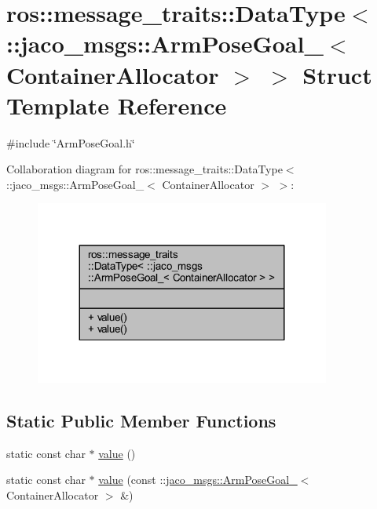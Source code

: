 \hypertarget{structros_1_1message__traits_1_1DataType_3_01_1_1jaco__msgs_1_1ArmPoseGoal___3_01ContainerAllocator_01_4_01_4}{}\section{ros\+:\+:message\+\_\+traits\+:\+:Data\+Type$<$ \+:\+:jaco\+\_\+msgs\+:\+:Arm\+Pose\+Goal\+\_\+$<$ Container\+Allocator $>$ $>$ Struct Template Reference}
\label{structros_1_1message__traits_1_1DataType_3_01_1_1jaco__msgs_1_1ArmPoseGoal___3_01ContainerAllocator_01_4_01_4}


{\ttfamily \#include \char`\"{}Arm\+Pose\+Goal.\+h\char`\"{}}



Collaboration diagram for ros\+:\+:message\+\_\+traits\+:\+:Data\+Type$<$ \+:\+:jaco\+\_\+msgs\+:\+:Arm\+Pose\+Goal\+\_\+$<$ Container\+Allocator $>$ $>$\+:
\nopagebreak
\begin{figure}[H]
\begin{center}
\leavevmode
\includegraphics[width=275pt]{dc/dcc/structros_1_1message__traits_1_1DataType_3_01_1_1jaco__msgs_1_1ArmPoseGoal___3_01ContainerAllocator_01_4_01_4__coll__graph}
\end{center}
\end{figure}
\subsection*{Static Public Member Functions}
\begin{DoxyCompactItemize}
\item 
static const char $\ast$ \hyperlink{structros_1_1message__traits_1_1DataType_3_01_1_1jaco__msgs_1_1ArmPoseGoal___3_01ContainerAllocator_01_4_01_4_aae8e99197e3f5e003812f2f746f9c7c1}{value} ()
\item 
static const char $\ast$ \hyperlink{structros_1_1message__traits_1_1DataType_3_01_1_1jaco__msgs_1_1ArmPoseGoal___3_01ContainerAllocator_01_4_01_4_a659ddcab4e86e38283d3c26b7bec19af}{value} (const \+::\hyperlink{structjaco__msgs_1_1ArmPoseGoal__}{jaco\+\_\+msgs\+::\+Arm\+Pose\+Goal\+\_\+}$<$ Container\+Allocator $>$ \&)
\end{DoxyCompactItemize}


